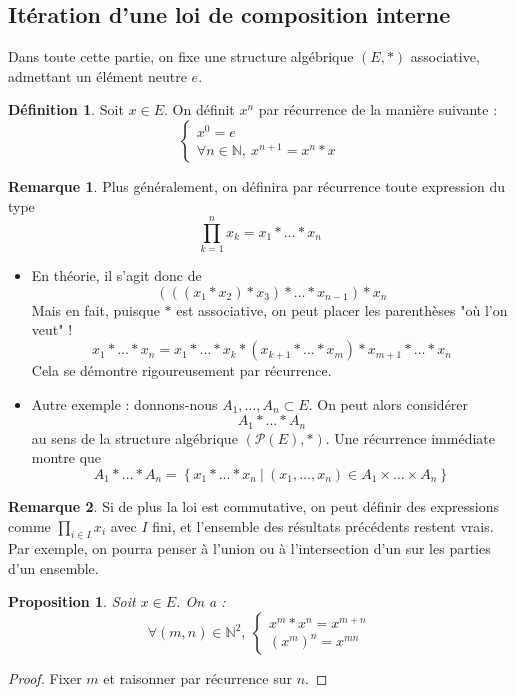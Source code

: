 \documentclass[french]{book}
\newcommand{\N}{\mathbb{N}}
\theoremstyle{plain}
\newtheorem{prop}{Proposition}[chapter]
\theoremstyle{definition}
\newtheorem{dfn}{Définition}[chapter]
\newtheorem{rmq}{Remarque}[chapter]
\theoremstyle{remark}
\begin{document}
\subsection{Itération d'une loi de composition interne}
Dans toute cette partie, on fixe une structure algébrique $(E,*)$ associative, admettant un élément neutre $e$.
\begin{dfn}
	Soit $x\in E$. On définit $x^n$ par récurrence de la manière suivante : $$\left \{ \begin{array}{ll}
		x^0=e \\ \forall n\in\N,\ x^{n+1}=x^n*x
	\end{array}\right.$$
\end{dfn}
\begin{rmq}
	Plus généralement, on définira par récurrence toute expression du type $$\prod_{k=1}^{n}x_k=x_1*\ldots*x_n$$
	\begin{itemize}
		\item En théorie, il s'agit donc de $$\left(\left(\left(x_1*x_2\right)*x_3\right)*\ldots*x_{n-1}\right)*x_n$$ Mais en fait, puisque $*$ est associative, on peut placer les parenthèses "où l'on veut" ! $$x_1*\ldots*x_n=x_1*\ldots*x_k*(x_{k+1}*\ldots*x_m)*x_{m+1}*\ldots*x_n$$ Cela se démontre rigoureusement par récurrence.
		\item Autre exemple : donnons-nous $A_1,\ldots,A_n\subset E$. On peut alors considérer $$A_1*\ldots*A_n$$ au sens de la structure algébrique $(\mathcal{P}(E),*)$. Une récurrence immédiate montre que $$A_1*\ldots*A_n=\left\{x_1*\ldots*x_n\ | \ (x_1,\ldots,x_n)\in A_1\times\ldots\times A_n \right\}$$
	\end{itemize}
\end{rmq}
\begin{rmq}
	Si de plus la loi est commutative, on peut définir des expressions comme $\displaystyle \prod_{i\in I}x_i$ avec $I$ fini, et l'ensemble des résultats précédents restent vrais. Par exemple, on pourra penser à l'union ou à l'intersection d'un	sur les parties d'un ensemble.
\end{rmq}
\begin{prop}
	Soit $x\in E$. On a : $$\forall (m,n)\in\N^2,\ \left \{ \begin{array}{ll} x^m*x^n=x^{m+n} \\ (x^m)^n=x^{mn}\end{array}\right.$$
\end{prop}
\begin{proof}
	Fixer $m$ et raisonner par récurrence sur $n$.
\end{proof}
\end{document}
